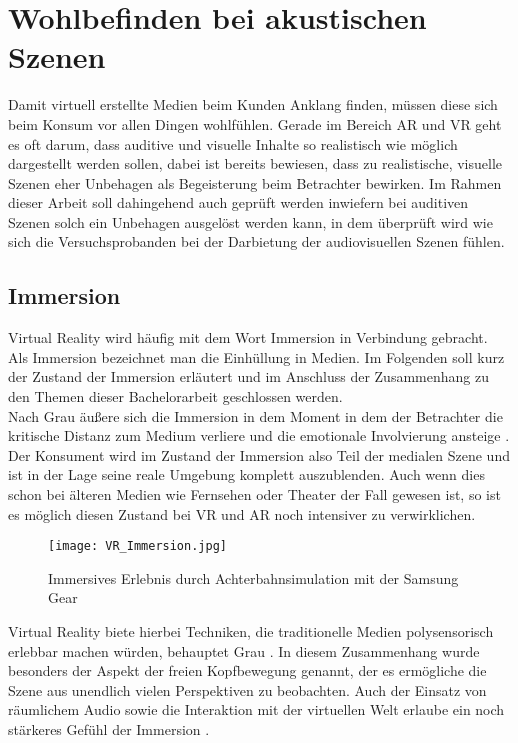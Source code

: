 \section{Wohlbefinden bei akustischen Szenen}
Damit virtuell erstellte Medien beim Kunden Anklang finden, müssen diese sich beim Konsum vor allen Dingen wohlfühlen. Gerade im Bereich AR und VR geht es oft darum, dass auditive und visuelle Inhalte so realistisch wie möglich dargestellt werden sollen, dabei ist bereits bewiesen, dass zu realistische, visuelle Szenen eher Unbehagen als Begeisterung beim Betrachter bewirken. Im Rahmen dieser Arbeit soll dahingehend auch geprüft werden inwiefern bei auditiven Szenen solch ein Unbehagen ausgelöst werden kann, in dem überprüft wird wie sich die Versuchsprobanden bei der Darbietung der audiovisuellen Szenen fühlen. 

 \subsection{Immersion}
 Virtual Reality wird häufig mit dem Wort Immersion in Verbindung gebracht. Als Immersion bezeichnet man die Einhüllung in Medien. Im Folgenden soll kurz der Zustand der Immersion erläutert und im Anschluss der Zusammenhang zu den Themen dieser Bachelorarbeit geschlossen werden. \\
Nach Grau äußere sich die Immersion in dem Moment in dem der Betrachter die kritische Distanz zum Medium verliere und die emotionale Involvierung ansteige \cite[S.13]{Grau03}. Der Konsument wird im Zustand der Immersion also Teil der medialen Szene und ist in der Lage seine reale Umgebung komplett auszublenden. Auch wenn dies schon bei älteren Medien wie Fernsehen oder Theater der Fall gewesen ist, so ist es möglich diesen Zustand bei VR und AR noch intensiver zu verwirklichen.  \\

\begin{figure}[H]
\centering
\texttt{[image: VR\_Immersion.jpg]}
\caption{Immersives Erlebnis durch Achterbahnsimulation mit der Samsung Gear}
\label{fig:VR_Immersion}
\end{figure}

Virtual Reality biete hierbei Techniken, die traditionelle Medien polysensorisch erlebbar machen würden, behauptet Grau \cite[S.15]{Grau03}.  In diesem Zusammenhang wurde besonders der Aspekt der freien Kopfbewegung genannt, der es ermögliche die Szene aus unendlich vielen Perspektiven zu beobachten. Auch der Einsatz von räumlichem Audio sowie die Interaktion mit der virtuellen Welt erlaube ein noch stärkeres Gefühl der Immersion \cite[S.16]{Grau03}. \\
 
